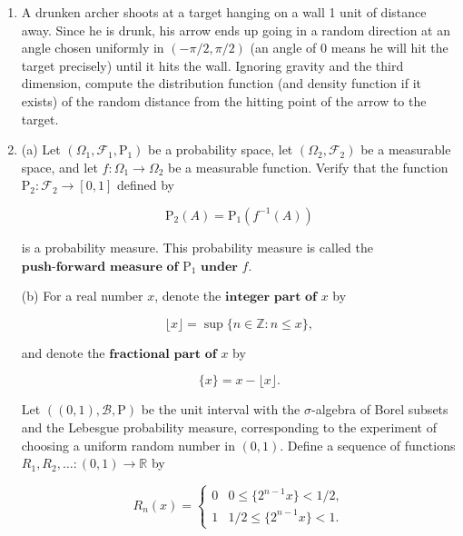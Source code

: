 \documentclass[11pt]{report}
\newcommand{\fitwidth}[1]{%
  \sbox\fitbox{#1}%
  \ifdim\wd\fitbox>\linewidth\resizebox{\linewidth}{!}{\usebox\fitbox}\else\usebox\fitbox\fi}
\providecommand{\cal}{\mathcal}
\newcommand{\R}{\mathbb{R}}
\newcommand{\Z}{\mathbb{Z}}
\theoremstyle{plain}
\theoremstyle{definition}
\begin{document}
\begin{enumerate}[label=\arabic*.]
Compute the lower and upper quantile functions of $F$, defined by

\begin{center}
\fitwidth{$\displaystyle
\begin{array}{ccc} X_*(p) &=& \sup \{ x : F(x) < p \}, \\
X^*(p) &=& \inf \{ x : F(x) > p \},
\end{array} \qquad\qquad (0<p<1).
$}
\end{center}

A recommended way is to plot $F$ on paper and then figure out the quantiles by ``eyeballing''. Of course, the answer should be spelled out in precise formulas.
\item A drunken archer shoots at a target hanging on a wall 1 unit of distance away. Since he is drunk, his arrow ends up going in a random direction at an angle chosen uniformly in $(-\pi/2,\pi/2)$ (an angle of $0$ means he will hit the target precisely) until it hits the wall. Ignoring gravity and the third dimension, compute the distribution function (and density function if it exists) of the random distance from the hitting point of the arrow to the target.
\item (a) Let $(\Omega_1, {\cal F}_1, \mathrm{P}_1)$ be a probability space, let $(\Omega_2, {\cal F}_2)$ be a measurable space, and let $f:\Omega_1\to\Omega_2$ be a measurable function. Verify that the function $\mathrm{P}_2:{\cal F}_2\to [0,1]$ defined by

\[
\mathrm{P}_2(A) = \mathrm{P}_1(f^{-1}(A))
\]

is a probability measure. This probability measure is called the $\textbf{push-forward measure of } \mathrm{P}_1 \textbf{ under } f$.

(b) For a real number $x$, denote the $\textbf{integer part of } x$ by

\[
\lfloor x \rfloor = \sup \{ n \in \Z : n \le x \},
\]

and denote the $\textbf{fractional part of } x$ by

\[
\{ x \} = x - \lfloor x \rfloor.
\]

Let $((0,1), {\cal B}, \mathrm{P})$ be the unit interval with the $\sigma$-algebra of Borel subsets and the Lebesgue probability measure, corresponding to the experiment of choosing a uniform random number in $(0,1)$.
Define a sequence of functions $R_1, R_2, \ldots : (0,1) \to \R$ by

\[
R_n(x) = \begin{cases} 0 & 0 \le \{ 2^{n-1} x \} < 1/2, \\ 1 &
1/2 \le \{ 2^{n-1} x \} < 1. \end{cases}
\]


\end{enumerate}
\end{document}
